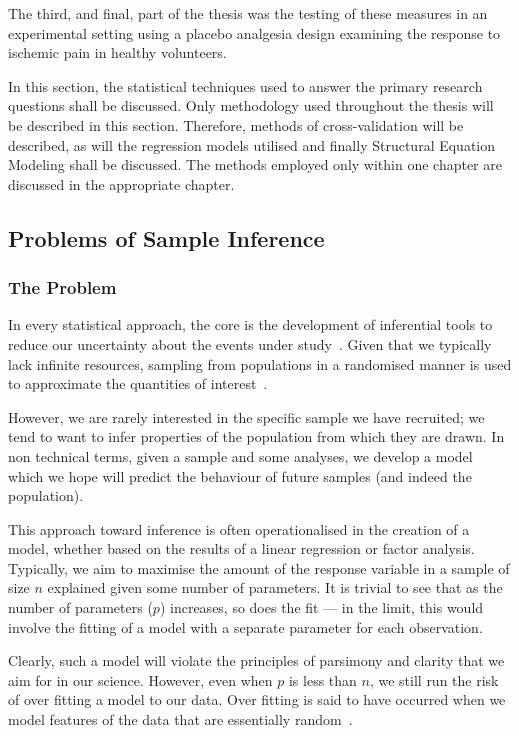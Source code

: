 The third, and final, part of the thesis was the testing of these measures in an experimental setting using a placebo analgesia design examining the response to ischemic pain in healthy volunteers. 


In this section, the statistical techniques used to answer the primary research questions shall be discussed. Only methodology used throughout the thesis will be described in this section. Therefore, methods of cross-validation will be described, as will the regression models utilised and finally Structural Equation Modeling shall be discussed. The methods employed only within one chapter are discussed in the appropriate chapter. 

\subsection{Problems of Sample Inference}
\label{sec:probl-sample-infer}
\subsubsection{The Problem}

In every statistical approach, the core is the development of inferential tools to reduce our uncertainty about the events under study~\cite{gelman2010philosophy}. Given that we typically lack infinite resources, sampling from populations in a randomised manner is used to approximate the quantities of interest~\cite{venables2002modern}.

However, we are rarely interested in the specific sample we have recruited; we tend to want to infer properties of the population  from which they are drawn.  In non technical terms, given a sample and some analyses, we develop a model which we hope will predict the behaviour of future samples (and indeed the population).

This approach toward inference is often operationalised in the creation of a model, whether based on the results of a linear regression or factor analysis. Typically, we aim to maximise the amount of the response variable  in a sample of size $n$ explained given some number of parameters. It is trivial to see that as the number of parameters ($p$) increases, so does the fit --- in the limit, this would involve the fitting of a model with a separate parameter for each observation. 

Clearly, such a model will violate the principles of parsimony and clarity that we aim for in our science. However, even when $p$ is less than $n$, we still run the risk of over fitting a model to our data. Over fitting is said to have occurred when we model features of the data that are essentially random~\cite{friedman2009elements}. 


